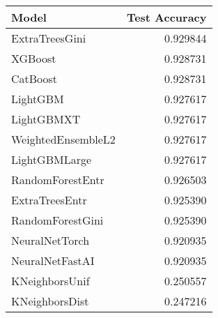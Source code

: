 \begin{tabular}{lr}
\toprule
Model & Test Accuracy \\
\midrule
ExtraTreesGini & 0.929844 \\
XGBoost & 0.928731 \\
CatBoost & 0.928731 \\
LightGBM & 0.927617 \\
LightGBMXT & 0.927617 \\
WeightedEnsembleL2 & 0.927617 \\
LightGBMLarge & 0.927617 \\
RandomForestEntr & 0.926503 \\
ExtraTreesEntr & 0.925390 \\
RandomForestGini & 0.925390 \\
NeuralNetTorch & 0.920935 \\
NeuralNetFastAI & 0.920935 \\
KNeighborsUnif & 0.250557 \\
KNeighborsDist & 0.247216 \\
\bottomrule
\end{tabular}

